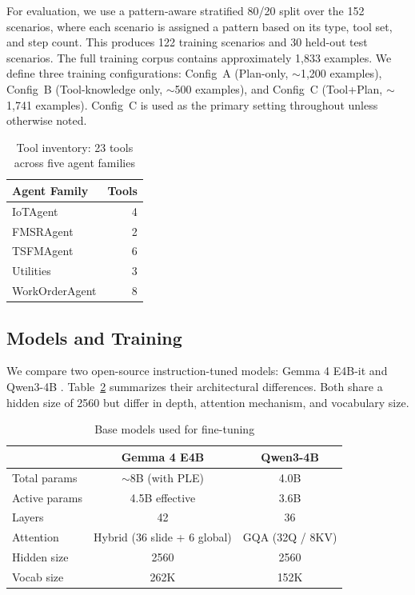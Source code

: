 \documentclass[conference]{IEEEtran}
\begin{document}
For evaluation, we use a pattern-aware stratified 80/20 split over the 152 scenarios, where each scenario is assigned a pattern based on its type, tool set, and step count. This produces 122 training scenarios and 30 held-out test scenarios. The full training corpus contains approximately 1,833 examples. We define three training configurations: Config~A (Plan-only, $\sim$1,200 examples), Config~B (Tool-knowledge only, $\sim$500 examples), and Config~C (Tool+Plan, $\sim$1,741 examples). Config~C is used as the primary setting throughout unless otherwise noted.

\begin{table}[ht]
\centering
\caption{Tool inventory: 23 tools across five agent families}
\label{tab:compact-tool-inventory}
\begin{tabular}{lr}
\hline
Agent Family & Tools \\
\hline
IoTAgent & 4 \\
FMSRAgent & 2 \\
TSFMAgent & 6 \\
Utilities & 3 \\
WorkOrderAgent & 8 \\
\hline
\end{tabular}
\end{table}

\subsection{Models and Training}

We compare two open-source instruction-tuned models: Gemma 4 E4B-it \cite{b6} and Qwen3-4B \cite{b17}. Table~\ref{tab:model-summary} summarizes their architectural differences. Both share a hidden size of 2560 but differ in depth, attention mechanism, and vocabulary size.

\begin{table}[t]
\centering
\caption{Base models used for fine-tuning}
\label{tab:model-summary}
\footnotesize
\begin{tabular}{lcc}
\hline
 & \textbf{Gemma 4 E4B} & \textbf{Qwen3-4B} \\
\hline
Total params & $\sim$8B (with PLE) & 4.0B \\
Active params & 4.5B effective & 3.6B \\
Layers & 42 & 36 \\
Attention & Hybrid (36 slide + 6 global) & GQA (32Q / 8KV) \\
Hidden size & 2560 & 2560 \\
Vocab size & 262K & 152K \\
\hline
\end{tabular}
\end{table}
\end{document}
